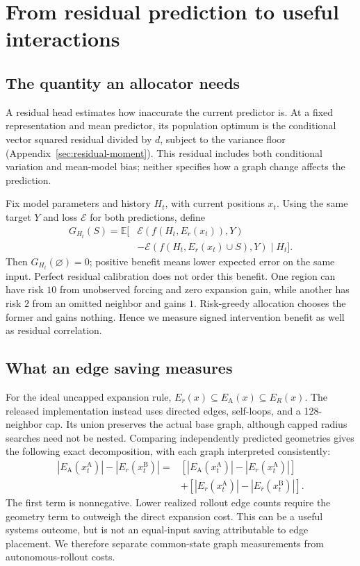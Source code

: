 \section{From residual prediction to useful interactions}
\subsection{The quantity an allocator needs}
A residual head estimates how inaccurate the current predictor is. At a fixed representation and mean predictor, its population optimum is the conditional vector squared residual divided by $d$, subject to the variance floor (Appendix~\ref{sec:residual-moment}). This residual includes both conditional variation and mean-model bias; neither specifies how a graph change affects the prediction.

Fix model parameters and history $H_t$, with current positions $x_t$. Using the same target $Y$ and loss $\mathcal E$ for both predictions, define
\begin{align}
 G_{H_t}(S)=\mathbb E[&\mathcal E(f(H_t,E_r(x_t)),Y)\nonumber\\
              &-\mathcal E(f(H_t,E_r(x_t)\cup S),Y)\mid H_t].
\end{align}
Then $G_{H_t}(\varnothing)=0$; positive benefit means lower expected error on the same input. Perfect residual calibration does not order this benefit. One region can have risk $10$ from unobserved forcing and zero expansion gain, while another has risk $2$ from an omitted neighbor and gains $1$. Risk-greedy allocation chooses the former and gains nothing. Hence we measure signed intervention benefit as well as residual correlation.

\subsection{What an edge saving measures}
For the ideal uncapped expansion rule, $E_r(x)\subseteq E_{\mathrm A}(x)\subseteq E_R(x)$. The released implementation instead uses directed edges, self-loops, and a 128-neighbor cap. Its union preserves the actual base graph, although capped radius searches need not be nested. Comparing independently predicted geometries gives the following exact decomposition, with each graph interpreted consistently:
\begin{align}
 |E_{\mathrm A}(x_t^{\mathrm A})|-|E_r(x_t^{\mathrm B})|
 ={}&[|E_{\mathrm A}(x_t^{\mathrm A})|-|E_r(x_t^{\mathrm A})|]\nonumber\\
 &+[|E_r(x_t^{\mathrm A})|-|E_r(x_t^{\mathrm B})|].
 \label{eq:decomposition}
\end{align}
The first term is nonnegative. Lower realized rollout edge counts require the geometry term to outweigh the direct expansion cost. This can be a useful systems outcome, but is not an equal-input saving attributable to edge placement. We therefore separate common-state graph measurements from autonomous-rollout costs.

